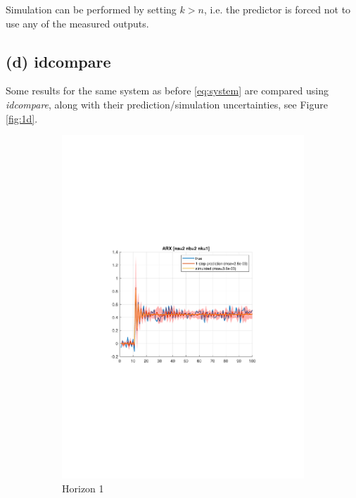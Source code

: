 \documentclass[]{article}
\begin{document}
Simulation can be performed by setting $k > n$, i.e. the predictor is forced not to use any of the measured outputs. 

\subsection{(d) idcompare}
Some results for the same system as before \eqref{eq:system} are compared using \emph{idcompare}, along with their prediction/simulation uncertainties, see Figure \ref{fig:1d}.
\begin{figure}[ht]
\centering
\begin{subfigure}{.30\textwidth}
	\centering
	\includegraphics[trim= 10cm 8cm 10cm 8cm, scale=0.3]{figures/1d-horizon_1.pdf}
	\caption{Horizon 1}
	\label{fig:1d-horizon1}
\end{subfigure}
\begin{subfigure}{.30\textwidth}

\end{subfigure}
\end{figure}
\end{document}
